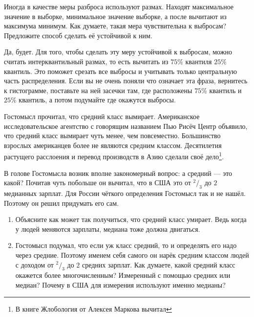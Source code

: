 \documentclass[12pt, a4paper, oneside]{article}
\theoremstyle{plain} %
\theoremstyle{definition}
\newcounter{problem}%
\renewcommand{\theproblem}{\arabic{problem}}
\newenvironment{problem}{
\addtocounter{problem}{1}\noindent{ \color{titleblue} \large \bfseries Упражнение~\theproblem \vspace{1ex} \newline}
}{ }
\begin{document}
\begin{problem}
Иногда в качестве меры разброса используют размах. Находят максимальное значение в выборке, минимальное значение выборке, а после вычитают из максимума минимум. Как думаете, такая мера чувствительна к выбросам? Предложите способ сделать её устойчивой к ним.
\end{problem}

\begin{solution}
Да, будет. Для того, чтобы сделать эту меру устойчивой к выбросам, можно считать интерквантильный размах, то есть вычитать из $75\%$ квантиля $25\%$ квантиль. Это поможет срезать все выбросы и учитывать только центральную часть распределения. Если вы не очень поняли что означает эта фраза, вернитесь к гистограмме, поставьте на ней засечки там, где расположены $75\%$ квантиль и $25\%$ квантиль, а потом подумайте где окажутся выбросы. 
\end{solution}

\begin{problem} 
Гостомысл прочитал, что средний класс вымирает. Американское исследовательское агентство с говорящим названием Пью Рисёч Центр объявило, что средний класс вымирает чуть менее, чем повсеместно. Большинство взрослых американцев более не являются средним классом. Десятилетия растущего расслоения и перевод производств в Азию сделали своё дело\footnote{В книге Жлобология от Алексея Маркова вычитал}. 

В голове Гостомысла возник вполне закономерный вопрос: а средний --- это какой? Почитав чуть побольше он вычитал, что в США это от $^2/_3$ до $2$ медианных зарплат. Для России чёткого определения Гостомысл так и не нашёл. Поэтому он решил придумать его сам.

\begin{enumerate} 
\item Объясните как может так получиться, что средний класс умирает. Ведь когда у людей меняются зарплаты, медиана тоже должна двигаться. 

\item Гостомысл подумал, что если уж класс средний, то и определять его надо через средние. Поэтому именем себя самого он нарёк средним классом людей с доходом от $^2/_3$ до $2$ средних зарплат. Как думаете, какой средний класс окажется более многочисленным? Измеренный с помощью средних или медиан? Почему в США для измерения используют именно медианы?
\end{enumerate} 
\end{problem} 
\end{document}
